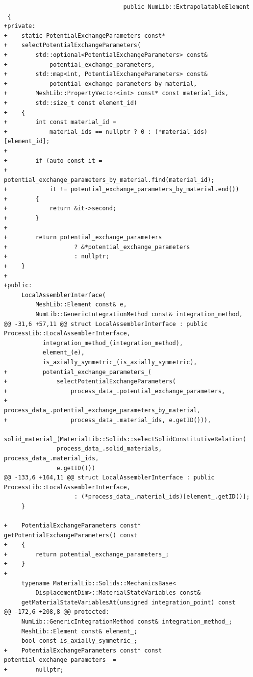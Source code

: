 \documentclass[10pt]{article}
\begin{document}
\begin{lstlisting}
                                  public NumLib::ExtrapolatableElement
 {
+private:
+    static PotentialExchangeParameters const*
+    selectPotentialExchangeParameters(
+        std::optional<PotentialExchangeParameters> const&
+            potential_exchange_parameters,
+        std::map<int, PotentialExchangeParameters> const&
+            potential_exchange_parameters_by_material,
+        MeshLib::PropertyVector<int> const* const material_ids,
+        std::size_t const element_id)
+    {
+        int const material_id =
+            material_ids == nullptr ? 0 : (*material_ids)[element_id];
+
+        if (auto const it =
+                potential_exchange_parameters_by_material.find(material_id);
+            it != potential_exchange_parameters_by_material.end())
+        {
+            return &it->second;
+        }
+
+        return potential_exchange_parameters
+                   ? &*potential_exchange_parameters
+                   : nullptr;
+    }
+
+public:
     LocalAssemblerInterface(
         MeshLib::Element const& e,
         NumLib::GenericIntegrationMethod const& integration_method,
@@ -31,6 +57,11 @@ struct LocalAssemblerInterface : public ProcessLib::LocalAssemblerInterface,
           integration_method_(integration_method),
           element_(e),
           is_axially_symmetric_(is_axially_symmetric),
+          potential_exchange_parameters_(
+              selectPotentialExchangeParameters(
+                  process_data_.potential_exchange_parameters,
+                  process_data_.potential_exchange_parameters_by_material,
+                  process_data_.material_ids, e.getID())),
           solid_material_(MaterialLib::Solids::selectSolidConstitutiveRelation(
               process_data_.solid_materials, process_data_.material_ids,
               e.getID()))
@@ -133,6 +164,11 @@ struct LocalAssemblerInterface : public ProcessLib::LocalAssemblerInterface,
                    : (*process_data_.material_ids)[element_.getID()];
     }
 
+    PotentialExchangeParameters const* getPotentialExchangeParameters() const
+    {
+        return potential_exchange_parameters_;
+    }
+
     typename MaterialLib::Solids::MechanicsBase<
         DisplacementDim>::MaterialStateVariables const&
     getMaterialStateVariablesAt(unsigned integration_point) const
@@ -172,6 +208,8 @@ protected:
     NumLib::GenericIntegrationMethod const& integration_method_;
     MeshLib::Element const& element_;
     bool const is_axially_symmetric_;
+    PotentialExchangeParameters const* const potential_exchange_parameters_ =
+        nullptr;
 

\end{lstlisting}
\end{document}
